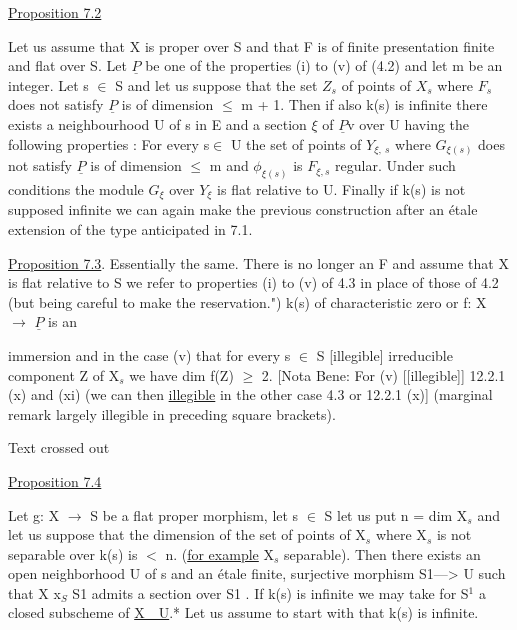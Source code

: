 \documentclass[11pt]{article}
\newcommand{\scanpage}[1]{\par\bigskip\noindent{\small\sffamily[scan #1]}\par}
\newcommand{\mspage}[1]{{\small\sffamily[p.\,#1]}}
\newcommand{\uline}[1]{\underline{#1}}
\begin{document}
\uline{Proposition 7.2}

Let us assume that X is proper over S and that F is of finite
presentation finite and flat over S.  Let $\underline{P}$ be one of the
properties (i) to (v) of (4.2) and let m be an integer.  Let s $\in$ S
and let us suppose that the set $Z_s$ of points of $X_s$ where $F_s$ does
not satisfy $\underline{P}$ is of dimension $\leq$ m + 1.  Then if also k(s) is
infinite there exists a neighbourhood U of s in E and a section $\xi$
of $\underline{P}\mathrm{v}$ over U having the following properties :  For every s$\in$ U the
set of points of $Y_{\xi,\ s}$ where $G_{\xi(s)}$ does not satisfy $\underline{P}$ is of
dimension $\leq$ m and $\phi_{\xi(s)}$ is $F_{\xi,s}$ regular.  Under such conditions the
module $G_\xi$ over $Y_\xi$ is flat relative to U.  Finally if k(s) is not
supposed infinite we can again make the previous construction
after an étale extension of the type anticipated in 7.1.

\uline{Proposition 7.3}.  Essentially the same.  There is no longer an F
and assume that X is flat relative to S we refer to properties (i)
to (v) of 4.3 in place of those of 4.2 (but being careful to make
the reservation.")  k(s) of characteristic zero or f: X $\rightarrow$ $\underline{P}$ is an

\clearpage
\scanpage{24/34}
\mspage{34}

immersion and in the case (v) that for every s $\in$ S [illegible]
irreducible component Z of X$_s$ we have dim f(Z) $\geq$ 2.
[Nota Bene:  For (v) [[illegible]] 12.2.1   (x) and (xi) (we can
then \uline{illegible} in the other case 4.3 or 12.2.1 (x)] (marginal
remark largely illegible in preceding square brackets).

Text crossed out

\uline{Proposition 7.4}

Let g:   X $\to$ S be a flat proper morphism, let s $\in$ S let us
put n = dim X$_s$ and let us suppose that the dimension of the set of
points of X$_s$ where X$_s$ is not separable over k(s) is  $<$ n.  (\uline{for
example}  X$_s$   separable).  Then there exists an open neighborhood
U of s and an \'etale finite, surjective morphism S1---> U such that
X \quad x$_S$ \quad S1 \quad admits a section over S1 .  If k(s) is infinite we
may take for S$^1$ a closed subscheme of \uline{X\ \ U}.*  Let us assume to
start with that k(s) is infinite.
\end{document}

